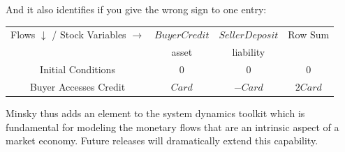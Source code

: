 And it also identifies if you give the wrong sign to one entry:

\begin{center}
\begin{tabular}{|c|cc|c|}
\hline
Flows $\downarrow$ / Stock Variables
$\rightarrow$&\multicolumn{1}{|c|}{$BuyerCredit$}&\multicolumn{1}{|c|}{$SellerDeposit$}&Row Sum\\\cline{2-3}&\multicolumn{1}{|c|}{asset}&\multicolumn{1}{|c|}{liability}&\\\hline
Initial Conditions&$0$&$0$&0\\
Buyer Accesses Credit&$Card$&$-Card$&$2Card$\\
\hline
\end{tabular}
\end{center}

Minsky thus adds an element to the system dynamics toolkit which is
fundamental for modeling the monetary flows that are an intrinsic
aspect of a market economy. Future releases will dramatically extend
this capability. 

